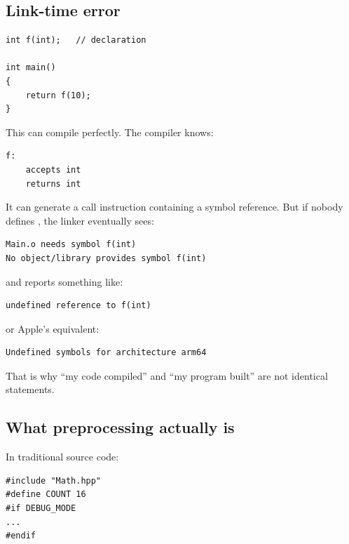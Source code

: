 \subsection{Link-time error}\label{05-engine-i-ch002-link-time-error}

\hypertarget{05-engine-i-ch002-link-time-error}{}

\begin{verbatim}
int f(int);   // declaration

int main()
{
    return f(10);
}
\end{verbatim}

This can compile perfectly. The compiler knows:

\begin{verbatim}
f:
    accepts int
    returns int
\end{verbatim}

It can generate a call instruction containing a symbol reference. But if nobody defines , the linker eventually sees:

\begin{verbatim}
Main.o needs symbol f(int)
No object/library provides symbol f(int)
\end{verbatim}

and reports something like:

\begin{verbatim}
undefined reference to f(int)
\end{verbatim}

or Apple's equivalent:

\begin{verbatim}
Undefined symbols for architecture arm64
\end{verbatim}

That is why ``my code compiled'' and ``my program built'' are not identical statements.

\subsection{What preprocessing actually is}\label{05-engine-i-ch002-what-preprocessing-actually-is}

\hypertarget{05-engine-i-ch002-what-preprocessing-actually-is}{}

In traditional source code:

\begin{verbatim}
#include "Math.hpp"
#define COUNT 16
#if DEBUG_MODE
...
#endif
\end{verbatim}

